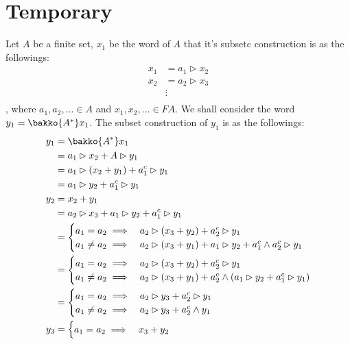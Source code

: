 \section{Temporary}
Let $A$ be a finite set, $x_1$ be the word of $A$ 
that it's subsetc construction is as the followings:
\begin{equation}\begin{split}
	x_1 &= a_1\rhd x_2 \\
	x_2 &= a_2\rhd x_3 \\
	&\vdots \\
\end{split}\end{equation}
, where $a_1,a_2,\dots\in A$  and $x_1,x_2,\dots\in FA$.
We shall consider the word $y_1=\bakko{A^*}x_1$.
The subset construction of $y_1$ is as the followings:
\begin{equation}\begin{split}
	y_1 &= \bakko{A^*}x_1 \\
		&= a_1\rhd x_2 + A\rhd y_1 \\
		&= a_1\rhd (x_2+y_1) + a_1^c\rhd y_1 \\
		&= a_1\rhd y_2 + a_1^c\rhd y_1 \\
	y_2 &= x_2 + y_1 \\
		&= a_2\rhd x_3 + a_1\rhd y_2 + a_1^c\rhd y_1 \\
		&= \begin{cases}
			a_1=a_2 \implies & a_2\rhd (x_3+y_2) + a_2^c\rhd y_1 \\
			a_1\not=a_2 \implies & a_2\rhd (x_3+y_1) + a_1\rhd y_2 + a_1^c\wedge a_2^c\rhd y_1 \\
			\end{cases} \\
		&= \begin{cases}
			a_1=a_2 \implies & a_2\rhd (x_3+y_2) + a_2^c\rhd y_1 \\
			a_1\not=a_2 \implies & a_2\rhd (x_3+y_1) + a_2^c\wedge(a_1\rhd y_2 + a_1^c\rhd y_1) \\
			\end{cases} \\
		&= \begin{cases}
			a_1=a_2 \implies & a_2\rhd y_3 + a_2^c\rhd y_1 \\
			a_1\not=a_2 \implies & a_2\rhd y_3 + a_2^c\wedge y_1 \\
			\end{cases} \\
	y_3 &= \begin{cases}
			a_1=a_2 \implies & x_3+y_2 \\

\end{cases}
\end{split}
\end{equation}
